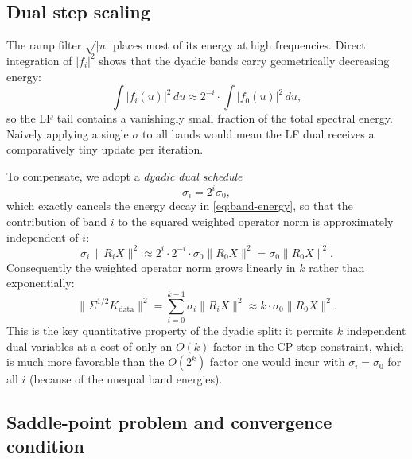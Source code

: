\documentclass{article}
\begin{document}
\subsection{Dual step scaling}\label{sec:sigma}

The ramp filter $\sqrt{|u|}$ places most of its energy at high
frequencies. Direct integration of $|f_i|^2$ shows that the dyadic
bands carry geometrically decreasing energy:
\begin{equation}\label{eq:band-energy}
  \int |f_i(u)|^2\,du \approx 2^{-i} \cdot \int |f_0(u)|^2\,du,
\end{equation}
so the LF tail contains a vanishingly small fraction of the total
spectral energy. Naively applying a single $\sigma$ to all bands
would mean the LF dual receives a comparatively tiny update per
iteration.

To compensate, we adopt a \emph{dyadic dual schedule}
\begin{equation}\label{eq:sigma-schedule}
  \sigma_i = 2^i \sigma_0,
\end{equation}
which exactly cancels the energy decay in \eqref{eq:band-energy}, so
that the contribution of band $i$ to the squared weighted operator
norm is approximately independent of $i$:
\begin{equation}\label{eq:sigma-cancels}
  \sigma_i \, \|R_i X\|^2 \approx 2^i \cdot 2^{-i} \cdot \sigma_0 \|R_0 X\|^2
    = \sigma_0 \|R_0 X\|^2.
\end{equation}
Consequently the weighted operator norm grows linearly in $k$ rather
than exponentially:
\begin{equation}\label{eq:norm-linear}
  \|\Sigma^{1/2} K_\text{data}\|^2
    = \sum_{i=0}^{k-1} \sigma_i \|R_i X\|^2
    \approx k \cdot \sigma_0 \|R_0 X\|^2.
\end{equation}
This is the key quantitative property of the dyadic split: it permits
$k$ independent dual variables at a cost of only an $O(k)$ factor in
the CP step constraint, which is much more favorable than the $O(2^k)$
factor one would incur with $\sigma_i = \sigma_0$ for all $i$ (because
of the unequal band energies).

\subsection{Saddle-point problem and convergence condition}
\end{document}
